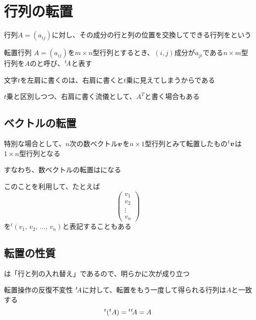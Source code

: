 \documentclass[../../../topic_linear-algebra]{subfiles}
\begin{document}
\sectionline
\section{行列の転置}

行列$A=(a_{ij})$に対し、その成分の行と列の位置を交換してできる行列をという

\begin{definition}{転置行列}
  $A = (a_{ij})$を$m \times n$型行列とするとき、$(i,j)$成分が$a_{ji}$である$n \times m$型行列を$A$のと呼び、${}^t\! A$と表す
\end{definition}

文字$t$を左肩に書くのは、右肩に書くと$t$乗に見えてしまうからである

$t$乗と区別しつつ、右肩に書く流儀として、$A^T$と書く場合もある

\subsection{ベクトルの転置}

特別な場合として、$n$次の数ベクトル$\vb*{v}$を$n \times 1$型行列とみて転置したもの${}^t\vb*{v}$は$1 \times n$型行列となる

すなわち、数ベクトルの転置はになる

\br

このことを利用して、たとえば
\begin{equation*}
  \begin{pmatrix}
    v_1    \\
    v_2    \\
    \vdots \\
    v_n
  \end{pmatrix}
\end{equation*}
を${}^t (v_1,\,v_2,\,\ldots,\,v_n)$と表記することもある

\subsection{転置の性質}

は「行と列の入れ替え」であるので、明らかに次が成り立つ

\begin{theorem}{転置操作の反復不変性}\label{thm:transpose-involution}
  ${}^t\! A$に対して、転置をもう一度して得られる行列は$A$と一致する
  \begin{equation*}
    {}^t ({}^t A) = {}^t{}^t\! A = A
  \end{equation*}
\end{theorem}
\end{document}
